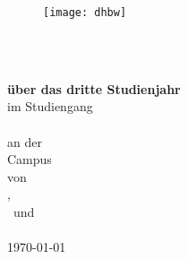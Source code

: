 
\begin{titlepage}


\begin{figure}
	\raggedleft
	\texttt{[image: dhbw]}
\end{figure}


\begin{center}
	\vspace*{0pt}
	\begin{LARGE}
		\textbf{\mytitle}\\
	\end{LARGE}
	\vspace*{4em}
	\textbf{\MakeUppercase{\mytypeofwork}\\über das dritte Studienjahr}\\
	\vspace*{2em}
	im Studiengang\\
	\mycourse\\
	\vspace*{2em}
	an der \myuniversity\\
	Campus \myuniversitycampus\\
	\vspace*{2em}
	von\\
	\vspace*{2em}
	\myauthora,\\\myauthorb\ und\\\myauthorc\\
	\vspace*{2em}
	\today\\
	\vspace*{3em}
	\vfill
	

\end{center}
\end{titlepage}
